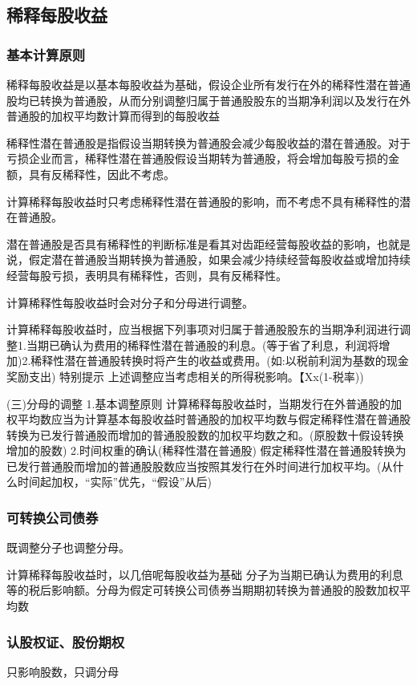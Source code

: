\documentclass[UTF8,12pt]{ctexart}
\numberwithin{equation}{section} %
\numberwithin{figure}{section}
\numberwithin{table}{section}
\begin{document}
	\subsection{稀释每股收益}
	\subsubsection{基本计算原则}
	稀释每股收益是以基本每股收益为基础，假设企业所有发行在外的稀释性潜在普通股均已转换为普通股，从而分别调整归属于普通股股东的当期净利润以及发行在外普通股的加权平均数计算而得到的每股收益
	
	稀释性潜在普通股是指假设当期转换为普通股会减少每股收益的潜在普通股。对于亏损企业而言，稀释性潜在普通股假设当期转为普通股，将会增加每股亏损的金额，具有反稀释性，因此不考虑。
	
	计算稀释每股收益时只考虑稀释性潜在普通股的影响，而不考虑不具有稀释性的潜在普通股。
	
	潜在普通股是否具有稀释性的判断标准是看其对齿距经营每股收益的影响，也就是说，假定潜在普通股当期转换为普通股，如果会减少持续经营每股收益或增加持续经营每股亏损，表明具有稀释性，否则，具有反稀释性。
	
	计算稀释性每股收益时会对分子和分母进行调整。
	
	计算稀释每股收益时，应当根据下列事项对归属于普通股股东的当期净利润进行调整1.当期已确认为费用的稀释性潜在普通股的利息。(等于省了利息，利润将增加)2.稀释性潜在普通股转换时将产生的收益或费用。(如:以税前利润为基数的现金奖励支出)
	特别提示
	上述调整应当考虑相关的所得税影响。【Xx(1-税率))
	
	(三)分母的调整
	1.基本调整原则
	计算稀释每股收益时，当期发行在外普通股的加权平均数应当为计算基本每股收益时普通股的加权平均数与假定稀释性潜在普通股转换为已发行普通股而增加的普通股股数的加权平均数之和。(原股数十假设转换增加的股数)
	2.时间权重的确认(稀释性潜在普通股)
	假定稀释性潜在普通股转换为已发行普通股而增加的普通股股数应当按照其发行在外时间进行加权平均。(从什么时间起加权，“实际”优先，“假设”从后)
	
	
	
	\subsubsection{可转换公司债券}
	既调整分子也调整分母。
	
	计算稀释每股收益时，以几倍呢每股收益为基础
	分子为当期已确认为费用的利息等的税后影响额。分母为假定可转换公司债券当期期初转换为普通股的股数加权平均数
	
	
	\subsubsection{认股权证、股份期权}
	只影响股数，只调分母
	
\end{document}
